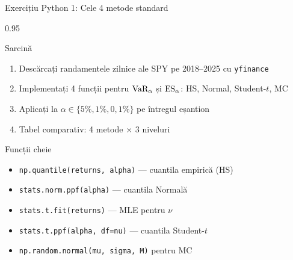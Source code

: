 \documentclass[9pt, aspectratio=169, t]{beamer}
\begin{document}
\begin{frame}[shrink=10]{Exercițiu Python 1: Cele 4 metode standard}
\begin{cminipage}{0.95\textwidth}
    \begin{block}{Sarcină}
    \begin{enumerate}\setlength{\itemsep}{0pt}
        \item Descărcați randamentele zilnice ale SPY pe 2018--2025 cu \texttt{yfinance}
        \item Implementați 4 funcții pentru $\text{VaR}_\alpha$ și $\text{ES}_\alpha$: HS, Normal, Student-$t$, MC
        \item Aplicați la $\alpha \in \{5\%, 1\%, 0{,}1\%\}$ pe întregul eșantion
        \item Tabel comparativ: 4 metode $\times$ 3 niveluri
    \end{enumerate}
    \end{block}
    \vspace{0.15cm}
    \begin{alertblock}{Funcții cheie}
    \begin{itemize}\setlength{\itemsep}{0pt}
        \item \texttt{np.quantile(returns, alpha)} --- cuantila empirică (HS)
        \item \texttt{stats.norm.ppf(alpha)} --- cuantila Normală
        \item \texttt{stats.t.fit(returns)} --- MLE pentru $\nu$
        \item \texttt{stats.t.ppf(alpha, df=nu)} --- cuantila Student-$t$
        \item \texttt{np.random.normal(mu, sigma, M)} pentru MC
    \end{itemize}
    \end{alertblock}
\end{cminipage}
\end{frame}
\end{document}
